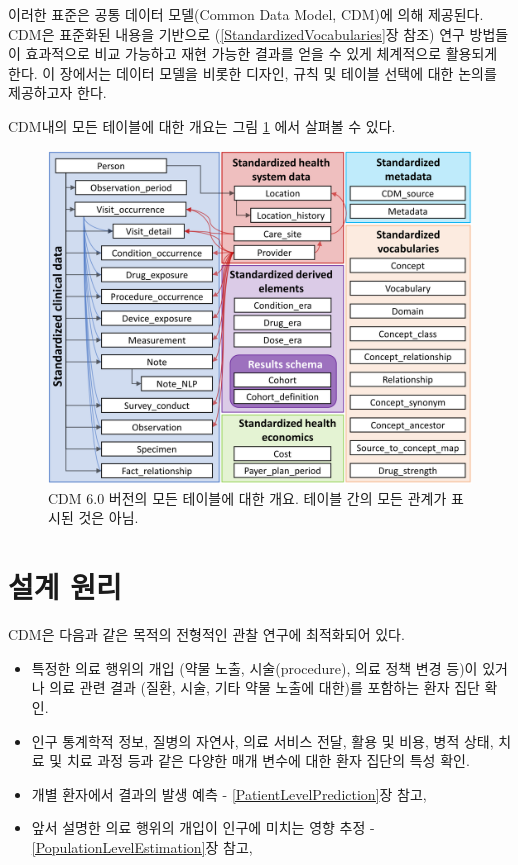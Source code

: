 \documentclass[11pt]{book}
\providecommand{\tightlist}{%
  \setlength{\itemsep}{0pt}\setlength{\parskip}{0pt}}
\theoremstyle{definition}
\theoremstyle{definition}
\theoremstyle{definition}
\theoremstyle{remark}
\begin{document}
이러한 표준은 공통 데이터 모델(Common Data Model, CDM)에 의해 제공된다.
CDM은 표준화된 내용을 기반으로 (\ref{StandardizedVocabularies}장 참조)
연구 방법들이 효과적으로 비교 가능하고 재현 가능한 결과를 얻을 수 있게
체계적으로 활용되게 한다. 이 장에서는 데이터 모델을 비롯한 디자인, 규칙
및 테이블 선택에 대한 논의를 제공하고자 한다.

CDM내의 모든 테이블에 대한 개요는 그림 \ref{fig:cdmDiagram}
에서 살펴볼 수 있다.

\begin{figure}
\includegraphics[width=1\linewidth]{images/CommonDataModel/cdmDiagram} \caption{CDM 6.0 버전의 모든 테이블에 대한 개요. 테이블 간의 모든 관계가 표시된 것은 아님.}\label{fig:cdmDiagram}
\end{figure}

\section{설계 원리}\label{-}

CDM은 다음과 같은 목적의 전형적인 관찰 연구에 최적화되어
있다.

\begin{itemize}
\tightlist
\item
  특정한 의료 행위의 개입 (약물 노출, 시술(procedure), 의료 정책 변경
  등)이 있거나 의료 관련 결과 (질환, 시술, 기타 약물 노출에 대한)를
  포함하는 환자 집단 확인.
\item
  인구 통계학적 정보, 질병의 자연사, 의료 서비스 전달, 활용 및 비용,
  병적 상태, 치료 및 치료 과정 등과 같은 다양한 매개 변수에 대한 환자
  집단의 특성 확인.
\item
  개별 환자에서 결과의 발생 예측 - \ref{PatientLevelPrediction}장 참고,
\item
  앞서 설명한 의료 행위의 개입이 인구에 미치는 영향 추정 -
  \ref{PopulationLevelEstimation}장 참고,
\end{itemize}
\end{document}
